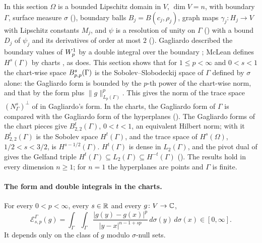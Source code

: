 In this section $\Omega$ is a bounded Lipschitz domain in $V$, $\dim V = n$, with boundary
$\Gamma$, surface measure $\sigma$ (), boundary balls
$B_j = B(c_j, \rho_j)$, graph maps $\gamma_j : H_j \to V$ with Lipschitz constants $M_j$, and
$\psi$ is a resolution of unity on $\Gamma$ () with a bound $D_j$ of
$\psi_j$ and its derivatives of order at most $2$ (). Gagliardo
described the boundary values of $W^{1}_{p}$ by a double integral over the boundary
\cite{Gagliardo1957}; McLean defines $H^s(\Gamma)$ by charts \cite[Chapter~3, p.~96]{McLean}, as
 does. This section shows that for $1 \leq p < \infty$ and
$0 < s < 1$ the chart-wise space $B^{s}_{p,p}(\Gamma)$ is the Sobolev--Slobodeckij space of
$\Gamma$ defined by $\sigma$ alone: the Gagliardo form is bounded by the $p$-th power of the
chart-wise norm, and that by the form plus $\|g\|_{L_p(\Gamma)}^p$. This gives the norm of the
trace space $(N^s_\Gamma)^\perp$ of  in Gagliardo's form. In the
charts, the Gagliardo form of $\Gamma$ is compared with the Gagliardo form of the hyperplanes
(). The Gagliardo forms of the chart pieces give
$B^t_{2,2}(\Gamma)$, $0 < t < 1$, an equivalent Hilbert norm; with it $B^t_{2,2}(\Gamma)$ is the
Sobolev space $H^t(\Gamma)$, and the trace space of $H^s(\Omega)$, $1/2 < s < 3/2$, is
$H^{s-1/2}(\Gamma)$. $H^t(\Gamma)$ is dense in $L_2(\Gamma)$, and the pivot dual of
 gives the Gelfand triple
$H^t(\Gamma) \subseteq L_2(\Gamma) \subseteq H^{-t}(\Gamma)$ ().
The results hold in every dimension $n \geq 1$; for $n = 1$ the hyperplanes
are points and $\Gamma$ is finite.

\paragraph{The form and double integrals in the charts.}

\begin{definition}
\label{def:boundary-slobodeckij-form}
\leanok
{}
For every $0 < p < \infty$, every $s \in \mathbb{R}$ and every $g \colon V \to \mathbb{C}$,
\[
  \mathcal{E}^\Gamma_{s,p}(g) = \int_\Gamma \int_\Gamma
    \frac{|g(y) - g(x)|^p}{|y - x|^{n - 1 + sp}} \, d\sigma(y) \, d\sigma(x) \in [0, \infty] .
\]
It depends only on the class of $g$ modulo $\sigma$-null sets.
\end{definition}

